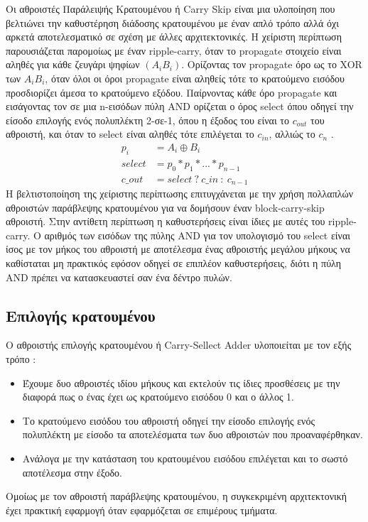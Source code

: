 Οι αθροιστές Παράλειψής Κρατουμένου ή Carry Skip είναι μια υλοποίηση που βελτιώνει την καθυστέρηση διάδοσης κρατουμένου με έναν απλό τρόπο αλλά όχι αρκετά αποτελεσματικό σε σχέση με άλλες αρχιτεκτονικές. 
Η χείριστη περίπτωση παρουσιάζεται παρομοίως με έναν ripple-carry, όταν το propagate στοιχείο είναι αληθές για κάθε ζευγάρι ψηφίων $(A_i B_i)$.
Ορίζοντας τον propagate όρο ως το XOR των $Α_i B_i$, όταν όλοι οι όροι propagate είναι αληθείς τότε το κρατούμενο εισόδου προσδιορίζει άμεσα το κρατούμενο εξόδου.
Παίρνοντας κάθε όρο propagate και εισάγοντας τον σε μια n-εισόδων πύλη AND ορίζεται ο όρος select όπου οδηγεί την είσοδο επιλογής ενός πολυπλέκτη 2-σε-1, όπου η έξοδος του είναι το $c_{out}$ του αθροιστή, και όταν το select είναι αληθές τότε επιλέγεται το $c_{in}$, αλλιώς το $c_n$ .
\begin{equation}
\begin{split}
    p_i &= A_i \oplus B_i \\
    select &= p_0 * p_1 * ... * p_{n-1} \\
    c\_out &= select\ ?\ c\_in\ :\ c_{n-1} %
\end{split}
\end{equation}
Η βελτιστοποίηση της χείριστης περίπτωσης επιτυγχάνεται με την χρήση πολλαπλών αθροιστών παράβλεψης κρατουμένου για να δομήσουν έναν block-carry-skip αθροιστή. Στην αντίθετη περίπτωση η καθυστερήσεις είναι ίδιες με αυτές του ripple-carry.
Ο αριθμός των εισόδων της πύλης AND για τον υπολογισμό του select είναι ίσος με τον μήκος του αθροιστή με αποτέλεσμα ένας αθροιστής μεγάλου μήκους να καθίσταται μη πρακτικός εφόσον οδηγεί σε επιπλέον καθυστερήσεις, διότι η πύλη AND πρέπει να κατασκευαστεί σαν ένα δέντρο πυλών.   



\subsection{Επιλογής κρατουμένου}
Ο αθροιστής επιλογής κρατουμένου ή Carry-Sellect Adder υλοποιείται με τον εξής τρόπο :
\begin{itemize}
  \item Έχουμε δυο αθροιστές ιδίου μήκους και εκτελούν τις ίδιες προσθέσεις με την διαφορά πως ο ένας έχει ως κρατούμενο εισόδου 0 και ο άλλος 1.
  \item Το κρατούμενο εισόδου του αθροιστή οδηγεί την είσοδο επιλογής ενός πολυπλέκτη με είσοδο τα αποτελέσματα των δυο αθροιστών που προαναφέρθηκαν.
  \item Ανάλογα με την κατάσταση του κρατουμένου εισόδου επιλέγεται και το σωστό αποτέλεσμα στην έξοδο.
\end{itemize} 
Ομοίως με τον αθροιστή παράβλεψης κρατουμένου, η συγκεκριμένη αρχιτεκτονική έχει πρακτική εφαρμογή όταν εφαρμόζεται σε επιμέρους τμήματα.









